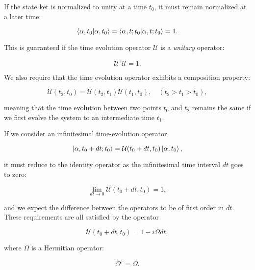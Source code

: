 If the state ket is normalized to unity at a time $t_0$,
it must remain normalized at a later time:

\begin{equation}
 \braket{\alpha, t_0 | \alpha, t_0} = \braket{\alpha, t; t_0
    | \alpha, t; t_0} = 1 .
\end{equation}

This is guaranteed if the time evolution operator 
$\mathcal{U}$ is a \textit{unitary} operator:

\begin{equation}
 \mathcal{U}^{\dagger} \mathcal{U} = 1 .
\end{equation}

We also require that the time evolution operator
exhibits a composition property:

\begin{equation}
 \mathcal{U}(t_2, t_0) = \mathcal{U}(t_2, t_1)
    \mathcal{U}(t_1, t_0), \quad (t_2 > t_1 > t_0) , 
\end{equation}

meaning that the time evolution between two points
$t_0$ and $t_2$ remains the same if we first evolve the system
to an intermediate time $t_1$.
\par
If we consider an infinitesimal time-evolution operator

\begin{equation}
 \ket{\alpha, t_0 + dt; t_0} = \mathcal{U}(t_0 + dt, t_0)
\ket{\alpha, t_0} ,
\end{equation}

it must reduce to the identity operator as the infinitesimal
time interval $dt$ goes to zero:

\begin{equation}
 \lim_{dt \rightarrow 0} \mathcal{U}(t_0 + dt, t_0) = 1, 
\end{equation}

and we expect the difference between the operators
to be of first order in $dt$.
\newline
These requirements are all satisfied by the operator

\begin{equation}
 \mathcal{U}(t_0 + dt, t_0) = 1 - i\Omega dt ,
\end{equation}

where $\Omega$ is a Hermitian operator:

\begin{equation}
 \Omega^{\dagger} = \Omega .
\end{equation}

